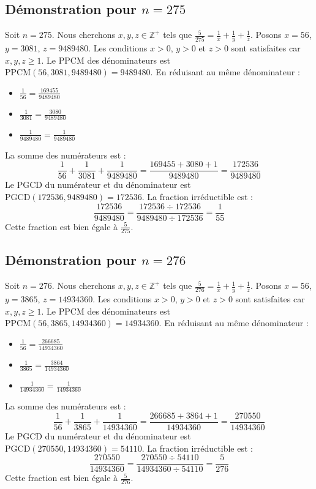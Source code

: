 \documentclass[11pt,a4paper]{article}
\begin{document}
\subsection{Démonstration pour $n = 275$}
Soit $n = 275$. Nous cherchons $x, y, z \in \mathbb{Z}^{+}$ tels que $\frac{5}{275} = \frac{1}{x} + \frac{1}{y} + \frac{1}{z}$.
Posons $x = 56$, $y = 3081$, $z = 9489480$.
Les conditions $x > 0$, $y > 0$ et $z > 0$ sont satisfaites car $x, y, z \geq 1$.
Le PPCM des dénominateurs est $\text{PPCM}(56, 3081, 9489480) = 9489480$.
En réduisant au même dénominateur :
\begin{itemize}
    \item $\frac{1}{56} = \frac{169455}{9489480}$
    \item $\frac{1}{3081} = \frac{3080}{9489480}$
    \item $\frac{1}{9489480} = \frac{1}{9489480}$
\end{itemize}
La somme des numérateurs est :
$$ \frac{1}{56} + \frac{1}{3081} + \frac{1}{9489480} = \frac{169455 + 3080 + 1}{9489480} = \frac{172536}{9489480} $$
Le PGCD du numérateur et du dénominateur est $\text{PGCD}(172536, 9489480) = 172536$.
La fraction irréductible est :
$$ \frac{172536}{9489480} = \frac{172536 \div 172536}{9489480 \div 172536} = \frac{1}{55} $$
Cette fraction est bien égale à $\frac{5}{275}$.

\subsection{Démonstration pour $n = 276$}
Soit $n = 276$. Nous cherchons $x, y, z \in \mathbb{Z}^{+}$ tels que $\frac{5}{276} = \frac{1}{x} + \frac{1}{y} + \frac{1}{z}$.
Posons $x = 56$, $y = 3865$, $z = 14934360$.
Les conditions $x > 0$, $y > 0$ et $z > 0$ sont satisfaites car $x, y, z \geq 1$.
Le PPCM des dénominateurs est $\text{PPCM}(56, 3865, 14934360) = 14934360$.
En réduisant au même dénominateur :
\begin{itemize}
    \item $\frac{1}{56} = \frac{266685}{14934360}$
    \item $\frac{1}{3865} = \frac{3864}{14934360}$
    \item $\frac{1}{14934360} = \frac{1}{14934360}$
\end{itemize}
La somme des numérateurs est :
$$ \frac{1}{56} + \frac{1}{3865} + \frac{1}{14934360} = \frac{266685 + 3864 + 1}{14934360} = \frac{270550}{14934360} $$
Le PGCD du numérateur et du dénominateur est $\text{PGCD}(270550, 14934360) = 54110$.
La fraction irréductible est :
$$ \frac{270550}{14934360} = \frac{270550 \div 54110}{14934360 \div 54110} = \frac{5}{276} $$
Cette fraction est bien égale à $\frac{5}{276}$.
\end{document}
